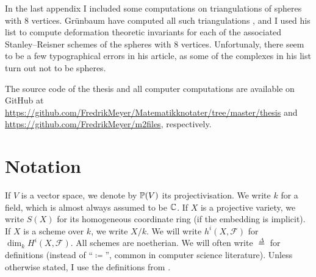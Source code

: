 In the last appendix I included some computations on triangulations of spheres with $8$ vertices. Grünbaum have computed all such triangulations \cite{grunbaum_enumeration}, and I used his list to compute deformation theoretic invariants for each of the associated Stanley--Reisner schemes of the spheres with $8$ vertices. Unfortunaly, there seem to be a few typographical errors in his article, as some of the complexes in his list turn out not to be spheres.

The source code of the thesis and all computer computations are available on GitHub at \url{https://github.com/FredrikMeyer/Matematikknotater/tree/master/thesis} and \url{https://github.com/FredrikMeyer/m2files}, respectively.

\section{Notation}

If $V$ is a vector space, we denote by $\P(V)$ its projectivisation. We write $k$ for a field, which is almost always assumed to be $\C$. If $X$ is a projective variety, we write $S(X)$ for its homogeneous coordinate ring (if the embedding is implicit). If $X$ is a scheme over $k$, we write $X/k$. We will write $h^i(X,\mathscr F)$ for $\dim_k H^i(X,\mathscr F)$. All schemes are noetherian. We will often write $\stackrel \Delta = $ for definitions (instead of  ``$\coloneq$'', common in computer science literature). Unless otherwise stated,  I use the definitions from \cite{hartshorne}.